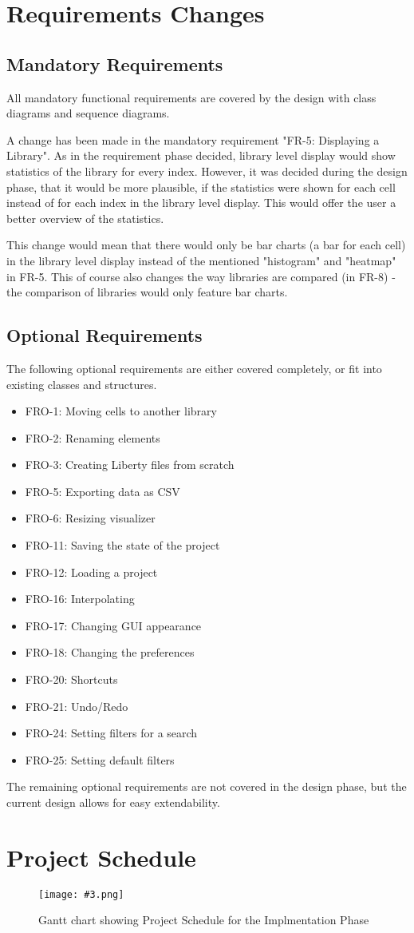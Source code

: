 \documentclass[10pt,a4paper]{report}
\newcommand{\includeimage}[5]{
    \begin{figure}[H]
        #1
        \texttt{[image: \#3.png]}
        \caption{#4}
        \label{fig:#5}
    \end{figure}
}
\newcommand{\patternentry}[2]{
    #1{#2}
}
\newcommand{\pattern}[2]{
    \patternentry{\section}{#1}
    {#2}
}
\begin{document}
\chapter{Requirements Changes}
\pattern{Mandatory Requirements}
{All mandatory functional requirements are covered by the design with class diagrams and sequence diagrams. \newline


A change has been made in the mandatory requirement "FR-5: Displaying a Library". As in the requirement phase decided, library level display would show statistics of the library for every index. However, it was decided during the design phase, that it would be more plausible, if the statistics were shown for each cell instead of for each index in the library level display. This would offer the user a better overview of the statistics. \newline

This change would mean that there would only be bar charts (a bar for each cell) in the library level display instead of the mentioned "histogram" and "heatmap" in FR-5. This of course also changes the way libraries are compared (in FR-8) - the comparison of libraries would only feature bar charts. }
\pattern{Optional Requirements}
{The following optional requirements are either covered completely, or fit into existing classes and structures. 
\begin{itemize}
    \item {FRO-1: Moving cells to another library}
    \item {FRO-2: Renaming elements}
    \item {FRO-3: Creating Liberty files from scratch}
    \item {FRO-5: Exporting data as CSV}
    \item {FRO-6: Resizing visualizer}
    \item {FRO-11: Saving the state of the project} 
    \item {FRO-12: Loading a project}
    \item {FRO-16: Interpolating}
    \item {FRO-17: Changing GUI appearance} 
    \item {FRO-18: Changing the preferences}
    \item {FRO-20: Shortcuts} 
    \item {FRO-21: Undo/Redo} 
    \item {FRO-24: Setting filters for a search} 
    \item {FRO-25: Setting default filters} 
\end{itemize}}
The remaining optional requirements are not covered in the design phase, but the current design allows for easy extendability.

\chapter{Project Schedule}
\includeimage{}{0.37}{ganttchart}{Gantt chart showing Project Schedule for the Implmentation Phase}{Gantt Chart}
\end{document}
